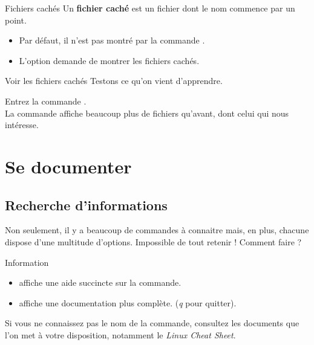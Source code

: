 \documentclass[a4paper,11pt]{style-esi/td}
\begin{document}
		\medskip
		\begin{theorie}{Fichiers cachés}
			Un \textbf{fichier caché} 
			est un fichier dont le nom commence par un point.
			\begin{itemize}
			\item Par défaut, il n'est pas montré par la commande .
			\item L'option  demande de montrer les fichiers cachés.
 			\end{itemize}
		\end{theorie}

		\begin{Experience}{Voir les fichiers cachés}
			Testons ce qu'on vient d'apprendre.
			\begin{steps}
			\item Entrez la commande .
				\\La commande affiche beaucoup plus de fichiers qu'avant,
				dont celui qui nous intéresse.
			\end{steps}
		\end{Experience}

\section{Se documenter}

	\subsection{Recherche d'informations}  

		Non seulement, il y a beaucoup de commandes à connaitre mais, en plus, 
		chacune dispose d'une multitude d'options. 
		Impossible de tout retenir ! Comment faire ?   

		\begin{theorie}{Information}
			\begin{itemize}
			\item 
				affiche une aide succincte sur la commande.
			\item 
				 affiche une documentation plus complète.
				(\textit{q} pour quitter).
			\end{itemize}
		\end{theorie}

		Si vous ne connaissez pas le nom de la commande,
		consultez les documents que l'on met à votre disposition,
		notamment le \textit{Linux Cheat Sheet}.  
\end{document}
